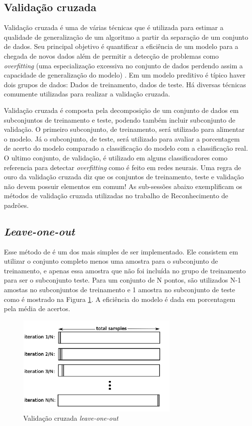 \documentclass[paper=a4, fontsize=11pt]{scrartcl}
\numberwithin{equation}{section}		%
\numberwithin{figure}{section}			%
\numberwithin{table}{section}				%
\begin{document}
	\subsection{Validação cruzada}
	Validação cruzada é uma de várias técnicas que é utilizada para estimar a qualidade de generalização de um algoritmo a partir da separação de um conjunto de dados. Seu principal objetivo é quantificar a eficiência de um modelo para a chegada de novos dados além de permitir a detecção de problemas como \textit{overfitting} (uma especialização excessiva no conjunto de dados perdendo assim a capacidade de generalização do modelo) . Em um modelo preditivo é típico haver dois grupos de dados: Dados de treinamento, dados de teste. Há diversas técnicas comumente utilizadas para realizar a validação cruzada.
	
	Validação cruzada é composta pela decomposição de um conjunto de dados em subconjuntos de treinamento e teste, podendo também incluir subconjunto de validação. O primeiro subconjunto, de treinamento, será utilizado para alimentar o modelo. Já o subconjunto, de teste, será utilizado para avaliar a porcentagem de acerto do modelo comparado a classificação do modelo com a classificação real. O ultimo conjunto, de validação, é utilizado em alguns classificadores como referencia para detectar \textit{overfitting} como é feito em redes neurais. Uma regra de ouro da validação cruzada diz que os conjuntos de treinamento, teste e validação não devem possuir elementos em comum! As sub-sessões abaixo exemplificam os métodos de validação cruzada utilizadas no trabalho de Reconhecimento de padrões.
	
	\subsection{\textit{Leave-one-out}}
	Esse método de é um dos mais simples de ser implementado. Ele consistem em utilizar o conjunto completo menos uma amostra para o subconjunto de treinamento, e apenas essa amostra que não foi incluída no grupo de treinamento para ser o subconjunto teste. Para um conjunto de N pontos, são utilizados N-1 amostas no subconjuntos de treinamento e 1 amostra no subconjunto de teste como é mostrado na Figura \ref{fig:loo}. A eficiência do modelo é dada em porcentagem pela média de acertos. 
	
	\begin{figure}[h!]
		\includegraphics[width=8cm]{img/Leave-One-Out-Cross-Validation.png}
		\centering
		\caption{Validação cruzada \textit{leave-one-out}}
		\label{fig:loo}
	\end{figure}
	
\end{document}
